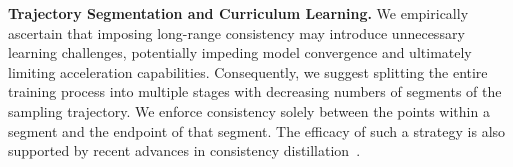 \noindent \textbf{Trajectory Segmentation and Curriculum Learning.}
We empirically ascertain that imposing long-range consistency may introduce unnecessary learning challenges, potentially impeding model convergence and ultimately limiting acceleration capabilities.
Consequently, we suggest splitting the entire training process into multiple stages with decreasing numbers of segments of the sampling trajectory. We enforce consistency solely between the points within a segment and the endpoint of that segment.
The efficacy of such a strategy is also supported by recent advances in consistency distillation~\cite{heek2024multistep,zheng2024trajectory,xie2024mlcm}.


